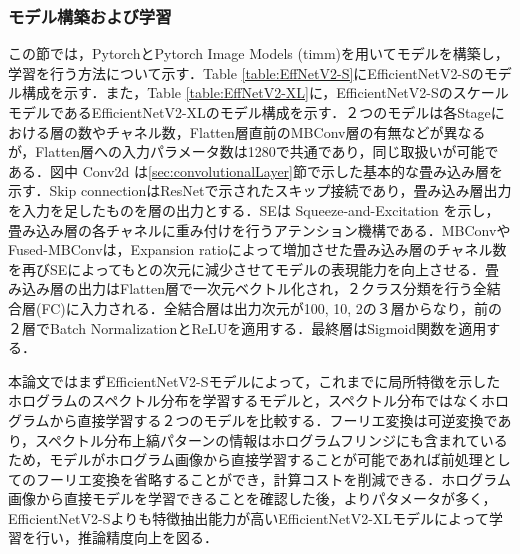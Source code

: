 \subsubsection{モデル構築および学習}
この節では，Pytorch\cite{paszke2019}とPytorch Image Models (timm)\cite{rw2019timm}を用いてモデルを構築し，学習を行う方法について示す．Table \ref{table:EffNetV2-S}にEfficientNetV2-Sのモデル構成を示す\cite{tan2021}．また，Table \ref{table:EffNetV2-XL}に，EfficientNetV2-SのスケールモデルであるEfficientNetV2-XLのモデル構成を示す．２つのモデルは各Stageにおける層の数やチャネル数，Flatten層直前のMBConv層の有無などが異なるが，Flatten層への入力パラメータ数は1280で共通であり，同じ取扱いが可能である．図中 Conv2d は\ref{sec:convolutionalLayer}節で示した基本的な畳み込み層を示す．Skip connectionはResNet\cite{he2016}で示されたスキップ接続であり，畳み込み層出力を入力を足したものを層の出力とする．SEは Squeeze-and-Excitation \cite{hu2018} を示し，畳み込み層の各チャネルに重み付けを行うアテンション機構である．MBConv\cite{tan2019}やFused-MBConv\cite{tan2021}は，Expansion ratioによって増加させた畳み込み層のチャネル数を再びSEによってもとの次元に減少させてモデルの表現能力を向上させる．畳み込み層の出力はFlatten層で一次元ベクトル化され，２クラス分類を行う全結合層(FC)に入力される．全結合層は出力次元が100, 10, 2の３層からなり，前の２層でBatch Normalization\cite{ioffe2015}とReLU\cite{nair2010}を適用する．最終層はSigmoid関数を適用する．

本論文ではまずEfficientNetV2-Sモデルによって，これまでに局所特徴を示したホログラムのスペクトル分布を学習するモデルと，スペクトル分布ではなくホログラムから直接学習する２つのモデルを比較する．フーリエ変換は可逆変換であり，スペクトル分布上縞パターンの情報はホログラムフリンジにも含まれているため，モデルがホログラム画像から直接学習することが可能であれば前処理としてのフーリエ変換を省略することができ，計算コストを削減できる．ホログラム画像から直接モデルを学習できることを確認した後，よりパタメータが多く，EfficientNetV2-Sよりも特徴抽出能力が高いEfficientNetV2-XLモデルによって学習を行い，推論精度向上を図る．

